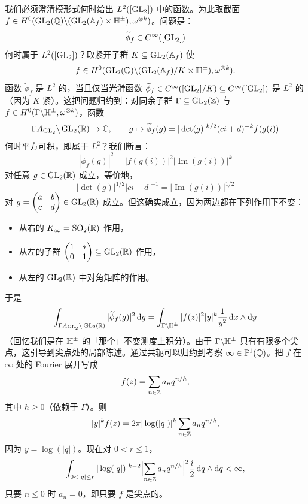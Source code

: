 我们必须澄清模形式何时给出 $L^2([\operatorname{GL}_2])$ 中的函数。为此取截面 $f\in H^0(\operatorname{GL}_2(\mathbb{Q})\backslash(\operatorname{GL}_2(\mathbb{A}_f)\times\mathbb{H}^\pm),\omega^{\otimes k})$。问题是：
\[
\widetilde\phi_f\in C^\infty([\operatorname{GL}_2])
\]
何时属于 $L^2([\operatorname{GL}_2])$？取紧开子群 $K\subseteq\operatorname{GL}_2(\mathbb{A}_f)$ 使
\[
f\in H^0(\operatorname{GL}_2(\mathbb{Q})\backslash(\operatorname{GL}_2(\mathbb{A}_f)/K\times\mathbb{H}^\pm),\omega^{\otimes k}).
\]
函数 $\widetilde\phi_f$ 是 $L^2$ 的，当且仅当光滑函数 $\widetilde\phi_f\in C^\infty([\operatorname{GL}_2]/K)\subseteq C^\infty([\operatorname{GL}_2])$ 是 $L^2$ 的（因为 $K$ 紧）。这把问题归约到：对同余子群 $\Gamma\subseteq\operatorname{GL}_2(\mathbb{Z})$ 与 $f\in H^0(\Gamma\backslash\mathbb{H}^\pm,\omega^{\otimes k})$，函数
\[
\Gamma A_{\operatorname{GL}_2}\backslash\operatorname{GL}_2(\mathbb{R})\to\mathbb{C},\qquad
g\mapsto\widetilde\phi_f(g)=|\det(g)|^{k/2}(ci+d)^{-k}f(g(i))
\]
何时平方可积，即属于 $L^2$？我们断言：
\[
|\widetilde\phi_f(g)|^2=|f(g(i))|^2|\operatorname{Im}(g(i))|^k
\]
对任意 $g\in\operatorname{GL}_2(\mathbb{R})$ 成立，等价地，
\[
|\det(g)|^{1/2}|ci+d|^{-1}=|\operatorname{Im}(g(i))|^{1/2}
\]
对 $g=\begin{pmatrix}a&b\\c&d\end{pmatrix}\in\operatorname{GL}_2(\mathbb{R})$ 成立。但这确实成立，因为两边都在下列作用下不变：
\begin{itemize}
\item 从右的 $K_\infty=\operatorname{SO}_2(\mathbb{R})$ 作用，
\item 从左的子群 $\begin{pmatrix}1&*\\0&1\end{pmatrix}\subseteq\operatorname{GL}_2(\mathbb{R})$ 作用，
\item 从左的 $\operatorname{GL}_2(\mathbb{R})$ 中对角矩阵的作用。
\end{itemize}
于是
\[
\int_{\Gamma A_{\operatorname{GL}_2}\backslash\operatorname{GL}_2(\mathbb{R})}|\widetilde\phi_f(g)|^2\,\mathrm{d}g
=\int_{\Gamma\backslash\mathbb{H}^\pm}|f(z)|^2|y|^k\frac{1}{y^2}\,\mathrm{d}x\wedge\mathrm{d}y
\]
（回忆我们是在 $\mathbb{H}^\pm$ 的「那个」不变测度上积分）。由于 $\Gamma\backslash\mathbb{H}^\pm$ 只有有限多个尖点，这引导到尖点处的局部陈述。通过共轭可以归约到考察 $\infty\in\mathbb{P}^1(\mathbb{Q})$。把 $f$ 在 $\infty$ 处的 Fourier 展开写成
\[
f(z)=\sum_{n\in\mathbb{Z}}a_nq^{n/h},
\]
其中 $h\ge0$（依赖于 $\Gamma$）。则
\[
|y|^kf(z)=2\pi|\log(|q|)|^k\sum_{n\in\mathbb{Z}}a_nq^{n/h},
\]
因为 $y=\log(|q|)$。现在对 $0<r\le1$，
\[
\int_{0<|q|\le r}|\log(|q|)|^{k-2}\Bigl|\sum_{n\in\Z}a_nq^{n/h}\Bigr|^2\frac{i}{2}\,\mathrm{d}q\wedge\mathrm{d}\bar q<\infty,
\]
只要 $n\le0$ 时 $a_n=0$，即只要 $f$ 是尖点的。

